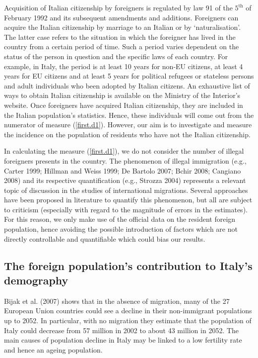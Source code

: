 \documentclass[10pt]{article}
\theoremstyle{definition}
\theoremstyle{plain}
\begin{document}
Acquisition of Italian citizenship by foreigners is regulated by law 91 of the $5^\text{th}$ of February 1992 and its subsequent amendments and additions. Foreigners can acquire the Italian citizenship by marriage to an Italian or by `naturalisation'. The latter case refers to the situation in which the foreigner has lived in the country from a certain period of time. Such a period varies dependent on the status of the person in question and the specific laws of each country. For example, in Italy, the period is at least 10 years for non-EU citizens, at least 4 years for EU citizens and at least 5 years for political refugees or stateless persons and adult individuals who been adopted by Italian citizens. An exhaustive list of ways to obtain Italian citizenship is available on the Ministry of the Interior's website. Once foreigners have acquired Italian citizenship, they are included in the Italian population's statistics. Hence, these individuals will come out from the numerator of measure (\ref{first.d1}). However, our aim is to investigate and measure the incidence on the population of  residents who have not the Italian citizenship.

In calculating the measure (\ref{first.d1}), we do not consider the number of illegal foreigners presents in the country. The phenomenon of illegal immigration (e.g., Carter 1999; Hillman and Weiss 1999; De Bartolo 2007; Bchir 2008; Cangiano 2008) and its respective quantification (e.g., Strozza 2004) represents a relevant topic of discussion in the studies of international migrations. Several approaches have been proposed in literature to quantify this phenomenon, but all are subject to criticism (especially with regard to the magnitude of errors in the estimates). For this reason, we only make use of the official data on the resident foreign population, hence avoiding the possible introduction of factors which are not directly controllable and quantifiable which could bias our results. 

\subsection{The foreign population's contribution to Italy's demography \label{DEM}}

Bijak et al. (2007) shows that in the absence of migration, many of the 27 European Union countries could see a decline in their non-immigrant populations up to 2052. In particular, with no migration they estimate that the population of Italy could decrease from 57 million in 2002 to about 43 million in 2052. The main causes of population decline in Italy may be linked to a low fertility rate and hence an ageing population. 
\end{document}
